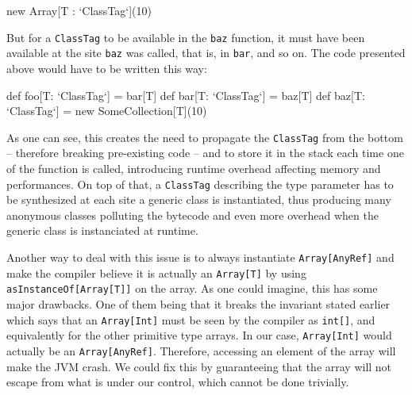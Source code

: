 \begin{lstlisting-nobreak} 
  new Array[T : `ClassTag`](10) 
\end{lstlisting-nobreak}

But for a \lstinline|ClassTag| to be available in the \lstinline|baz| function, it must have been available at the site \lstinline|baz| was called, that is, in \lstinline|bar|, and so on. The code presented above would have to be written this way:
 
\begin{lstlisting-nobreak}
  def foo[T: `ClassTag`] = bar[T]
  def bar[T: `ClassTag`] = baz[T]
  def baz[T: `ClassTag`] = new SomeCollection[T](10)
\end{lstlisting-nobreak}

As one can see, this creates the need to propagate the \lstinline|ClassTag| from the bottom -- therefore breaking pre-existing code -- and to store it in the stack each time one of the function is called, introducing runtime overhead affecting memory and performances. On top of that, a \lstinline|ClassTag| describing the type parameter has to be synthesized at each site a generic class is instantiated, thus producing many anonymous classes polluting the bytecode and even more overhead when the generic class is instanciated at runtime.  


Another way to deal with this issue is to always instantiate \lstinline|Array[AnyRef]| and make the compiler believe it is actually an \lstinline|Array[T]| by using \lstinline|asInstanceOf[Array[T]]| on the array. As one could imagine, this has some major drawbacks. One of them being that it breaks the invariant stated earlier which says that an \lstinline|Array[Int]| must be seen by the compiler as \lstinline|int[]|, and equivalently for the other primitive type arrays. In our case, \lstinline|Array[Int]| would actually be an \lstinline|Array[AnyRef]|. Therefore, accessing an element of the array will make the JVM crash. We could fix this by guaranteeing that the array will not escape from what is under our control, which cannot be done trivially. 


